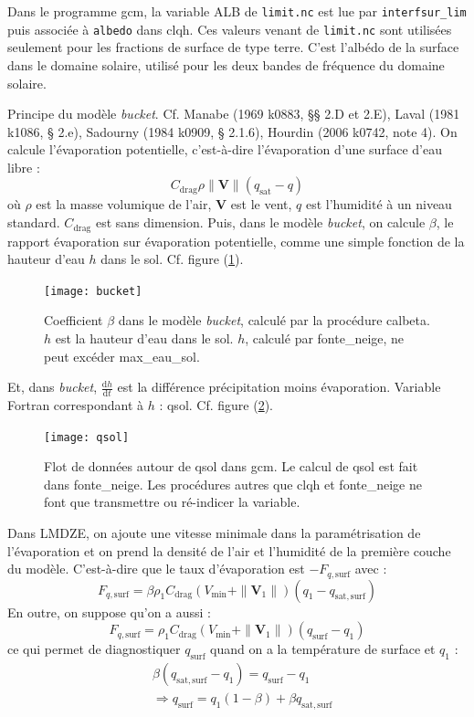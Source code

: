 \documentclass[a4paper,english,french]{article}
\newcommand{\ud}{\mathrm{d}}
\newcommand{\Eng}[1]{\textit{\foreignlanguage{english}{#1}}}
\begin{document}
Dans le programme gcm, la variable ALB de \verb+limit.nc+ est lue par
\verb+interfsur_lim+ puis associée à \verb+albedo+ dans clqh. Ces
valeurs venant de \verb+limit.nc+ sont utilisées seulement pour les
fractions de surface de type terre. C'est l'albédo de la surface dans
le domaine solaire, utilisé pour les deux bandes de fréquence du
domaine solaire.

Principe du modèle \Eng{bucket}. Cf. Manabe (1969 k0883, §§ 2.D et
2.E), Laval (1981 k1086, § 2.e), Sadourny (1984 k0909, § 2.1.6),
Hourdin (2006 k0742, note 4). On calcule l'évaporation potentielle,
c'est-à-dire l'évaporation d'une surface d'eau libre :
\begin{equation*}
  C_\mathrm{drag} \rho \|\mathbf{V}\| (q_\mathrm{sat} - q)
\end{equation*}
où $\rho$ est la masse volumique de l'air, $\mathbf{V}$ est le vent,
$q$ est l'humidité à un niveau standard. $C_\mathrm{drag}$ est sans
dimension. Puis, dans le modèle \Eng{bucket}, on calcule $\beta$, le
rapport évaporation sur évaporation potentielle, comme une simple
fonction de la hauteur d'eau $h$ dans le sol. Cf. figure
(\ref{fig:bucket}).
\begin{figure}
  \centering
  \texttt{[image: bucket]}
  \caption[$\beta$ dans \Eng{bucket}]{Coefficient $\beta$ dans le modèle
    \Eng{bucket}, calculé par la procédure calbeta. $h$ est la hauteur d'eau
    dans le sol. $h$, calculé par fonte\_neige, ne peut excéder
    max\_eau\_sol.}
  \label{fig:bucket}
\end{figure}
Et, dans \Eng{bucket}, $\frac{\ud h}{\ud t}$ est la différence
précipitation moins évaporation. Variable Fortran correspondant à $h$
: qsol. Cf. figure (\ref{fig:qsol}).
\begin{figure}
  \centering
  \texttt{[image: qsol]}
  \caption[Flot de données autour de qsol dans gcm]{Flot de données
    autour de qsol dans gcm. Le calcul de qsol est fait dans
    fonte\_neige. Les procédures autres que clqh et fonte\_neige ne
    font que transmettre ou ré-indicer la variable.}
  \label{fig:qsol}
\end{figure}
Dans LMDZE, on ajoute une vitesse minimale dans la paramétrisation de
l'évaporation et on prend la densité de l'air et l'humidité de la
première couche du modèle. C'est-à-dire que le taux d'évaporation est $- F_{q,
  \mathrm{surf}}$ avec :
\begin{equation}
  \label{eq:F_q_surf}
  F_{q, \mathrm{surf}}
  = \beta \rho_1 C_\mathrm{drag} (V_\mathrm{min} + \| \mathbf{V}_1 \|)
  (q_1 - q_\mathrm{sat,surf})
\end{equation}
En outre, on suppose qu'on a aussi :
\begin{equation*}
  F_{q, \mathrm{surf}}
  = \rho_1 C_\mathrm{drag} (V_\mathrm{min} + \| \mathbf{V}_1 \|)
  (q_\mathrm{surf} - q_1)  
\end{equation*}
ce qui permet de diagnostiquer $q_\mathrm{surf}$ quand on a la
température de surface et $q_1$ :
\begin{align*}
  & \beta (q_\mathrm{sat,surf} - q_1) = q_\mathrm{surf} - q_1 \\
  & \Rightarrow q_\mathrm{surf} = q_1 (1 - \beta) + \beta q_\mathrm{sat,surf}
\end{align*}
\end{document}
